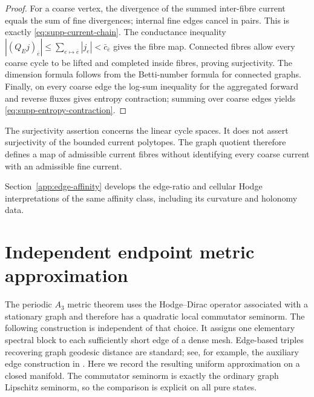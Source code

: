 \documentclass[11pt]{article}
\theoremstyle{definition}
\theoremstyle{remark}
\theoremstyle{definition}
\theoremstyle{remark}
\begin{document}
\begin{proof}
For a coarse vertex, the divergence of the summed inter-fibre current equals the
sum of fine divergences; internal fine edges cancel in pairs.  This is exactly
\eqref{eq:supp-current-chain}.  The conductance inequality
$|(Q_Ej)_{\bar e}|\le\sum_{e\mapsto\bar e}|j_e|<\bar c_{\bar e}$ gives the fibre
map.  Connected fibres allow every coarse cycle to be lifted and completed inside
fibres, proving surjectivity.  The dimension formula follows from the Betti-number
formula for connected graphs.  Finally, on every coarse edge the log-sum inequality
for the aggregated forward and reverse fluxes gives entropy contraction; summing
over coarse edges yields \eqref{eq:supp-entropy-contraction}.
\end{proof}

The surjectivity assertion concerns the linear cycle spaces.  It does not
assert surjectivity of the bounded current polytopes.  The graph quotient
therefore defines a map of admissible current fibres without identifying
every coarse current with an admissible fine current.

Section~\ref{app:edge-affinity} develops the edge-ratio and cellular Hodge
interpretations of the same affinity class, including its curvature and
holonomy data.

\section{Independent endpoint metric approximation}
\label{app:endpoint-metric}

The periodic $A_3$ metric theorem uses the Hodge--Dirac operator associated with a
stationary graph and therefore has a quadratic local commutator seminorm.  The
following construction is independent of that choice.  It assigns one elementary
spectral block to each sufficiently short edge of a dense mesh.  Edge-based
triples recovering graph geodesic distance are standard; see, for example, the
auxiliary edge construction in \cite{Besnard2021}.  Here we record the resulting
uniform approximation on a closed manifold.  The commutator seminorm is exactly
the ordinary graph Lipschitz seminorm, so the comparison is explicit on all pure
states.
\end{document}
